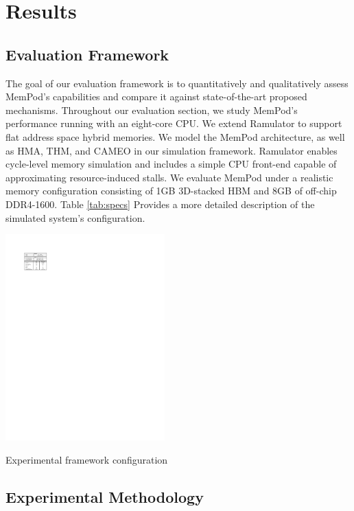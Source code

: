 \section{Results}
\label{sec:Results}

\subsection{Evaluation Framework}
\label{sub:Evaluation}

The goal of our evaluation framework is to quantitatively and qualitatively assess MemPod's capabilities and compare it against state-of-the-art proposed mechanisms. Throughout our evaluation section, we study MemPod's performance running with an eight-core CPU. We extend Ramulator \cite{kim-ramulator} to support flat address space hybrid memories. We model the MemPod architecture,
as well as HMA, THM, and CAMEO in our simulation framework. Ramulator enables 
cycle-level memory simulation and includes a simple CPU front-end capable of approximating resource-induced stalls. We evaluate MemPod under a realistic memory configuration consisting of 1GB 3D-stacked HBM \cite{JEDEC-HBM-REVISED} and 8GB of off-chip DDR4-1600. Table \ref{tab:specs} Provides a more detailed description of the simulated system's configuration.

\begin{table}[t]
  \includegraphics[width=0.46\textwidth]{figures/specs_table.pdf}
  \caption{Experimental framework configuration}
  \label{tab:specs}
\end{table}

\subsection{Experimental Methodology}
\label{sub:Experimental}

